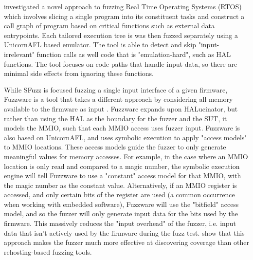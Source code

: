 \documentclass[../report.tex]{subfiles}
\begin{document}
\citet{Chen_2022} investigated a novel approach to fuzzing Real Time Operating
Systems (RTOS) which involves slicing a single program into its constituent
tasks and construct a call graph of program based on critical functions such as
external data entrypoints. Each tailored execution tree is was then fuzzed
separately using a UnicornAFL based emulator. The tool is able to detect and
skip "input-irrelevant" function calls as well code that is "emulation-hard",
such as HAL functions. The tool focuses on code paths that handle input data,
so there are minimal side effects from ignoring these functions.

While SFuzz is focused fuzzing a single input interface of a given firmware,
Fuzzware is a tool that takes a different approach by considering all memory
available to the firmware as input \citep{Fuzzware_2022}. Fuzzware expands upon
HALucinator, but rather than using the HAL as the boundary for the fuzzer and
the SUT, it models the MMIO, such that each MMIO access uses fuzzer input.
Fuzzware is also based on UnicornAFL, and uses symbolic execution to apply
"access models" to MMIO locations. These access models guide the fuzzer to only
generate meaningful values for memory accesses. For example, in the case where
an MMIO location is only read and compared to a magic number, the symbolic
execution engine will tell Fuzzware to use a "constant" access model for that
MMIO, with the magic number as the constant value. Alternatively, if an MMIO
register is accessed, and only certain bits of the register are used (a common
occurrence when working with embedded software), Fuzzware will use the
"bitfield" access model, and so the fuzzer will only generate input data for
the bits used by the firmware. This massively reduces the "input overhead" of
the fuzzer, i.e. input data that isn't actively used by the firmware during the
fuzz test. \citet{Fuzzware_2022} show that this approach makes the fuzzer much
more effective at discovering coverage than other rehosting-based fuzzing
tools.
\end{document}
